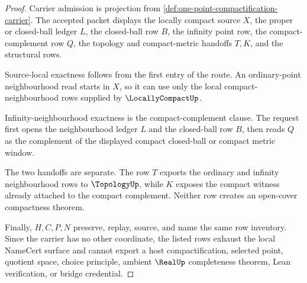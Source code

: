 \begin{proof}
Carrier admission is projection from \autoref{def:one-point-compactification-carrier}. The accepted packet displays the locally compact source $X$, the proper or closed-ball ledger $L$, the closed-ball row $B$, the infinity point row, the compact-complement row $Q$, the topology and compact-metric handoffs $T,K$, and the structural rows.

Source-local exactness follows from the first entry of the route. An ordinary-point neighbourhood read starts in $X$, so it can use only the local compact-neighbourhood rows supplied by $\LocallyCompactUp$.

Infinity-neighbourhood exactness is the compact-complement clause. The request first opens the neighbourhood ledger $L$ and the closed-ball row $B$, then reads $Q$ as the complement of the displayed compact closed-ball or compact metric window.

The two handoffs are separate. The row $T$ exports the ordinary and infinity neighbourhood rows to $\TopologyUp$, while $K$ exposes the compact witness already attached to the compact complement. Neither row creates an open-cover compactness theorem.

Finally, $H,C,P,N$ preserve, replay, source, and name the same row inventory. Since the carrier has no other coordinate, the listed rows exhaust the local NameCert surface and cannot export a host compactification, selected point, quotient space, choice principle, ambient $\RealUp$ completeness theorem, Lean verification, or bridge credential.
\end{proof}

